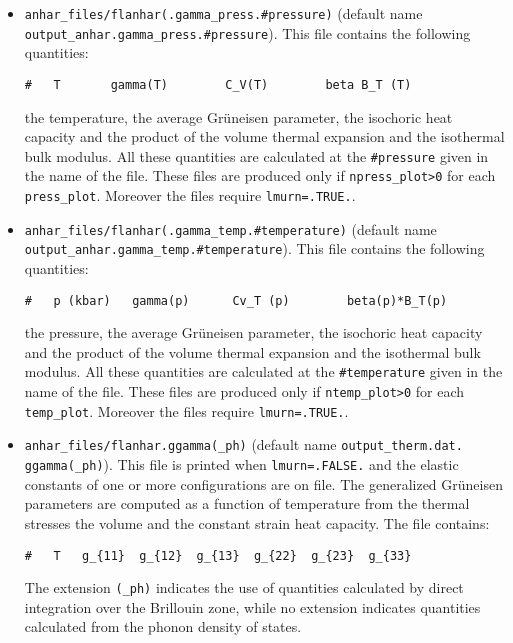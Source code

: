 \documentclass[12pt,a4paper,twoside]{report}
\begin{document}
\begin{itemize}
\item 
\texttt{anhar\_files/flanhar(.gamma\_press.\#pressure)} 
(default name \\ \texttt{output\_anhar.gamma\_press.\#pressure}). 
This file contains the following quantities:
\begin{verbatim}
#   T       gamma(T)        C_V(T)        beta B_T (T)    
\end{verbatim}
the temperature, the average Gr\"uneisen parameter, the isochoric
heat capacity and the product of the volume thermal expansion and the
isothermal bulk modulus.
All these quantities are calculated at the \texttt{\#pressure} given
in the name of the file.
These files are produced only if \texttt{npress\_plot>0} for each
\texttt{press\_plot}. Moreover the files require \texttt{lmurn=.TRUE.}.

\item 
\texttt{anhar\_files/flanhar(.gamma\_temp.\#temperature)} 
(default name \\ \texttt{output\_anhar.gamma\_temp.\#temperature}). 
This file contains the following quantities:
\begin{verbatim}
#   p (kbar)   gamma(p)      Cv_T (p)        beta(p)*B_T(p) 
\end{verbatim}
the pressure, the average Gr\"uneisen parameter, the isochoric
heat capacity and the product of the volume thermal expansion and the
isothermal bulk modulus.
All these quantities are calculated at the \texttt{\#temperature} given
in the name of the file.
These files are produced only if \texttt{ntemp\_plot>0} for each
\texttt{temp\_plot}. Moreover the files require \texttt{lmurn=.TRUE.}.

\item
\texttt{anhar\_files/flanhar.ggamma(\_ph)} (default name
\texttt{output\_therm.dat.} \texttt{ggamma(\_ph)}).
This file is printed when \texttt{lmurn=.FALSE.} and the elastic constants 
of one or more configurations are on file.
The generalized Gr\"uneisen parameters are computed as a function of 
temperature from the thermal stresses the volume and the 
constant strain heat capacity.
The file contains:
\begin{verbatim}
#   T   g_{11}  g_{12}  g_{13}  g_{22}  g_{23}  g_{33}
\end{verbatim}
The extension \texttt{(\_ph)} indicates the use of quantities 
calculated by direct integration over the Brillouin zone,
while no extension indicates quantities calculated from the phonon 
density of states.


\end{itemize}
\end{document}
